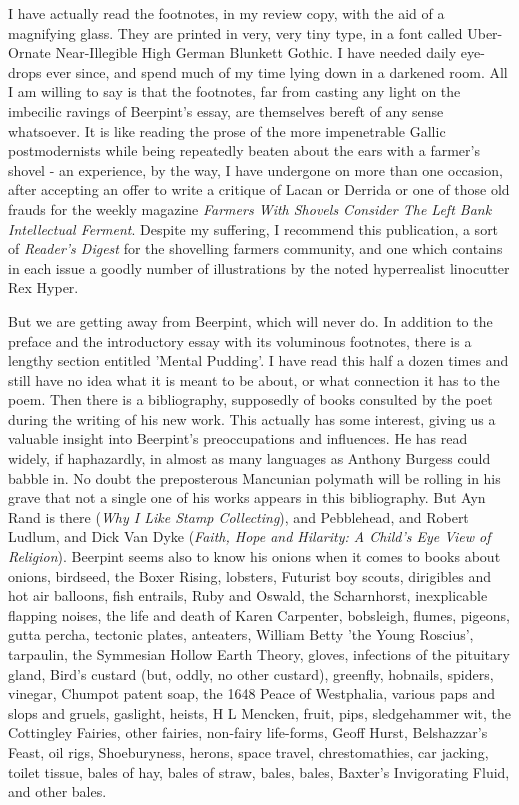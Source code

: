 I have actually read the footnotes, in my review copy, with the aid of a magnifying glass. They are printed in very, very tiny type, in a font called Uber-Ornate Near-Illegible High German Blunkett Gothic. I have needed daily eye-drops ever since, and spend much of my time lying down in a darkened room. All I am willing to say is that the footnotes, far from casting any light on the imbecilic ravings of Beerpint's essay, are themselves bereft of any sense whatsoever. It is like reading the prose of the more impenetrable Gallic postmodernists while being repeatedly beaten about the ears with a farmer's shovel - an experience, by the way, I have undergone on more than one occasion, after accepting an offer to write a critique of Lacan or Derrida or one of those old frauds for the weekly magazine \emph{Farmers With Shovels Consider The Left Bank Intellectual Ferment}. Despite my suffering, I recommend this publication, a sort of \emph{Reader's Digest} for the shovelling farmers community, and one which contains in each issue a goodly number of illustrations by the noted hyperrealist linocutter Rex Hyper.

But we are getting away from Beerpint, which will never do. In addition to the preface and the introductory essay with its voluminous footnotes, there is a lengthy section entitled 'Mental Pudding'. I have read this half a dozen times and still have no idea what it is meant to be about, or what connection it has to the poem. Then there is a bibliography, supposedly of books consulted by the poet during the writing of his new work. This actually has some interest, giving us a valuable insight into Beerpint's preoccupations and influences. He has read widely, if haphazardly, in almost as many languages as Anthony Burgess could babble in. No doubt the preposterous Mancunian polymath will be rolling in his grave that not a single one of his works appears in this bibliography. But Ayn Rand is there (\emph{Why I Like Stamp Collecting}), and Pebblehead, and Robert Ludlum, and Dick Van Dyke (\emph{Faith, Hope and Hilarity: A Child's Eye View of Religion}). Beerpint seems also to know his onions when it comes to books about onions, birdseed, the Boxer Rising, lobsters, Futurist boy scouts, dirigibles and hot air balloons, fish entrails, Ruby and Oswald, the Scharnhorst, inexplicable flapping noises, the life and death of Karen Carpenter, bobsleigh, flumes, pigeons, gutta percha, tectonic plates, anteaters, William Betty 'the Young Roscius', tarpaulin, the Symmesian Hollow Earth Theory, gloves, infections of the pituitary gland, Bird's custard (but, oddly, no other custard), greenfly, hobnails, spiders, vinegar, Chumpot patent soap, the 1648 Peace of Westphalia, various paps and slops and gruels, gaslight, heists, H L Mencken, fruit, pips, sledgehammer wit, the Cottingley Fairies, other fairies, non-fairy life-forms, Geoff Hurst, Belshazzar's Feast, oil rigs, Shoeburyness, herons, space travel, chrestomathies, car jacking, toilet tissue, bales of hay, bales of straw, bales, bales, Baxter's Invigorating Fluid, and other bales.


